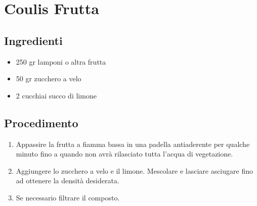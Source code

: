 \section{Coulis Frutta}
\subsection{Ingredienti}
\begin{itemize}
\item 250 gr lamponi o altra frutta  
\item 50 gr zucchero a velo  
\item 2 cucchiai succo di limone
\end{itemize}
\subsection{Procedimento}
\begin{enumerate}
\item  Appassire la frutta a fiamma bassa in una padella antiaderente per qualche minuto fino a quando non avrà rilasciato tutta l'acqua di vegetazione.  
\item  Aggiungere lo zucchero a velo e il limone. Mescolare e lasciare asciugare fino ad ottenere la densità desiderata.  
\item  Se necessario filtrare il composto.
\end{enumerate}

